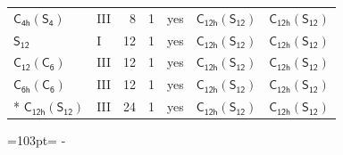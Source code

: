 \documentclass[10pt,a4paper]{article}
\newcommand{\needspace}[1]{\par\penalty-100\begingroup\dimen0=#1\relax\dimen2=\pagegoal
  \advance\dimen2-\pagetotal\ifdim\dimen0>\dimen2\relax\ifdim\dimen2>0pt\vfil\break\fi\fi
  \endgroup}
\numberwithin{equation}{section}
\newcommand{\grp}[1]{\mathsf{#1}}
\begin{document}
{\begin{longtable}{@{}llrrlll@{}}
\href{C4h-S4.pdf}{$\grp{C_{4h}}(\grp{S_{4}})$} & III & 8 & 1 & yes & \href{C12h-S12.pdf}{$\grp{C_{12h}}(\grp{S_{12}})$} & \href{C12h-S12.pdf}{$\grp{C_{12h}}(\grp{S_{12}})$}\\
\href{../../../rotation/data/pdf/S12.pdf}{$\grp{S_{12}}$} & I & 12 & 1 & yes & \href{C12h-S12.pdf}{$\grp{C_{12h}}(\grp{S_{12}})$} & \href{C12h-S12.pdf}{$\grp{C_{12h}}(\grp{S_{12}})$}\\
\href{C12-C6.pdf}{$\grp{C_{12}}(\grp{C_{6}})$} & III & 12 & 1 & yes & \href{C12h-S12.pdf}{$\grp{C_{12h}}(\grp{S_{12}})$} & \href{C12h-S12.pdf}{$\grp{C_{12h}}(\grp{S_{12}})$}\\
\href{C6h-C6.pdf}{$\grp{C_{6h}}(\grp{C_{6}})$} & III & 12 & 1 & yes & \href{C12h-S12.pdf}{$\grp{C_{12h}}(\grp{S_{12}})$} & \href{C12h-S12.pdf}{$\grp{C_{12h}}(\grp{S_{12}})$}\\*
\href{C12h-S12.pdf}{$\grp{C_{12h}}(\grp{S_{12}})$} & III & 24 & 1 & yes & \href{C12h-S12.pdf}{$\grp{C_{12h}}(\grp{S_{12}})$} & \href{C12h-S12.pdf}{$\grp{C_{12h}}(\grp{S_{12}})$}\\
\bottomrule\end{longtable}}
\needspace{103pt}
\end{document}
